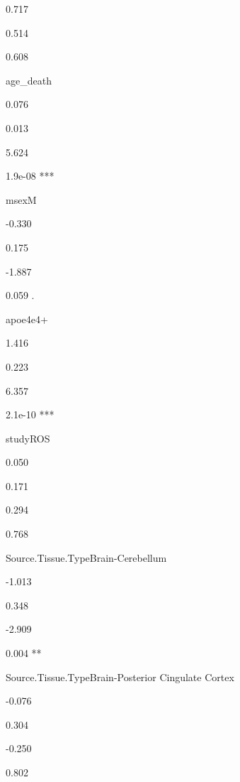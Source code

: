 \documentclass[]{book}
\begin{document}
0.717

0.514

0.608

age\_death

0.076

0.013

5.624

1.9e-08 ***

msexM

-0.330

0.175

-1.887

0.059 .

apoe4e4+

1.416

0.223

6.357

2.1e-10 ***

studyROS

0.050

0.171

0.294

0.768

Source.Tissue.TypeBrain-Cerebellum

-1.013

0.348

-2.909

0.004 **

Source.Tissue.TypeBrain-Posterior Cingulate Cortex

-0.076

0.304

-0.250

0.802
\end{document}
